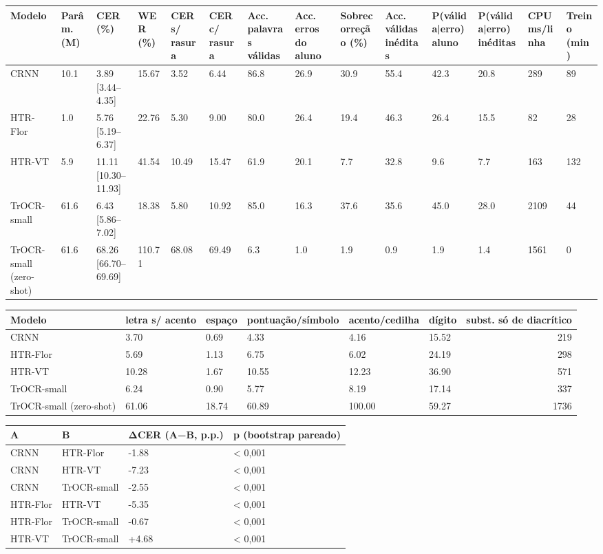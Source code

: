 \begin{tabular}{llllllllllllll}
\toprule
Modelo & Parâm. (M) & CER (\%) & WER (\%) & CER s/ rasura & CER c/ rasura & Acc. palavras válidas & Acc. erros do aluno & Sobrecorreção (\%) & Acc. válidas inéditas & P(válida|erro) aluno & P(válida|erro) inéditas & CPU ms/linha & Treino (min) \\
\midrule
CRNN & 10.1 & 3.89 [3.44–4.35] & 15.67 & 3.52 & 6.44 & 86.8 & 26.9 & 30.9 & 55.4 & 42.3 & 20.8 & 289 & 89 \\
HTR-Flor & 1.0 & 5.76 [5.19–6.37] & 22.76 & 5.30 & 9.00 & 80.0 & 26.4 & 19.4 & 46.3 & 26.4 & 15.5 & 82 & 28 \\
HTR-VT & 5.9 & 11.11 [10.30–11.93] & 41.54 & 10.49 & 15.47 & 61.9 & 20.1 & 7.7 & 32.8 & 9.6 & 7.7 & 163 & 132 \\
TrOCR-small & 61.6 & 6.43 [5.86–7.02] & 18.38 & 5.80 & 10.92 & 85.0 & 16.3 & 37.6 & 35.6 & 45.0 & 28.0 & 2109 & 44 \\
TrOCR-small (zero-shot) & 61.6 & 68.26 [66.70–69.69] & 110.71 & 68.08 & 69.49 & 6.3 & 1.0 & 1.9 & 0.9 & 1.9 & 1.4 & 1561 & 0 \\
\bottomrule
\end{tabular}

\begin{tabular}{llllllr}
\toprule
Modelo & letra s/ acento & espaço & pontuação/símbolo & acento/cedilha & dígito & subst. só de diacrítico \\
\midrule
CRNN & 3.70 & 0.69 & 4.33 & 4.16 & 15.52 & 219 \\
HTR-Flor & 5.69 & 1.13 & 6.75 & 6.02 & 24.19 & 298 \\
HTR-VT & 10.28 & 1.67 & 10.55 & 12.23 & 36.90 & 571 \\
TrOCR-small & 6.24 & 0.90 & 5.77 & 8.19 & 17.14 & 337 \\
TrOCR-small (zero-shot) & 61.06 & 18.74 & 60.89 & 100.00 & 59.27 & 1736 \\
\bottomrule
\end{tabular}

\begin{tabular}{llll}
\toprule
A & B & ΔCER (A−B, p.p.) & p (bootstrap pareado) \\
\midrule
CRNN & HTR-Flor & -1.88 & < 0,001 \\
CRNN & HTR-VT & -7.23 & < 0,001 \\
CRNN & TrOCR-small & -2.55 & < 0,001 \\
HTR-Flor & HTR-VT & -5.35 & < 0,001 \\
HTR-Flor & TrOCR-small & -0.67 & < 0,001 \\
HTR-VT & TrOCR-small & +4.68 & < 0,001 \\
\bottomrule
\end{tabular}

